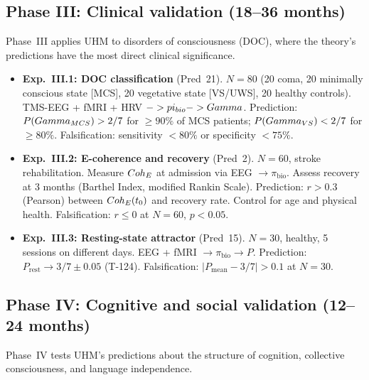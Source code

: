 \subsection{Phase III: Clinical validation (18--36 months)}
\label{subsec:phase3}

Phase~III applies UHM to disorders of consciousness (DOC), where the theory's predictions
have the most direct clinical significance.

\begin{itemize}[leftmargin=2em]
  \item \textbf{Exp.~III.1: DOC classification} (Pred~21). $N = 80$ (20 coma, 20 minimally
        conscious state [MCS], 20 vegetative state [VS/UWS], 20 healthy controls). TMS-EEG
        + fMRI + HRV $-> pi_{bio} -> Gamma$. Prediction:
        $P(Gamma_{MCS}) > 2/7$ for $\geq 90\%$ of MCS patients;
        $P(Gamma_{VS}) < 2/7$ for $\geq 80\%$. Falsification: sensitivity $< 80\%$
        or specificity $< 75\%$.
  \item \textbf{Exp.~III.2: E-coherence and recovery} (Pred~2). $N = 60$, stroke
        rehabilitation. Measure $Coh_E$ at admission via EEG $\to \pi_{\mathrm{bio}}$.
        Assess recovery at 3 months (Barthel Index, modified Rankin Scale). Prediction:
        $r > 0.3$ (Pearson) between $Coh_E(t_0)$ and recovery rate. Control for age and
        physical health. Falsification: $r \leq 0$ at $N = 60$, $p < 0.05$.
  \item \textbf{Exp.~III.3: Resting-state attractor} (Pred~15). $N = 30$, healthy,
        5 sessions on different days. EEG + fMRI $\to \pi_{\mathrm{bio}} \to P$. Prediction:
        $P_{\mathrm{rest}} \to 3/7 \pm 0.05$ (T-124). Falsification:
        $|P_{\mathrm{mean}} - 3/7| > 0.1$ at $N = 30$.
\end{itemize}

\subsection{Phase IV: Cognitive and social validation (12--24 months)}
\label{subsec:phase4}

Phase~IV tests UHM's predictions about the structure of cognition, collective consciousness,
and language independence.


